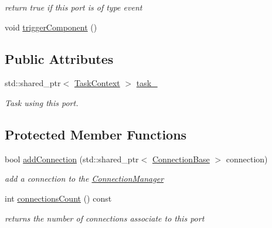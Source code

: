 \begin{DoxyCompactItemize}
\begin{DoxyCompactList}\small\item\em return true if this port is of type event \end{DoxyCompactList}\item 
void \hyperlink{classcoco_1_1_port_base_a8de69f58ac8d4110b51cba2616dc0ebc}{trigger\-Component} ()
\end{DoxyCompactItemize}
\subsection*{Public Attributes}
\begin{DoxyCompactItemize}
\item 
\hypertarget{classcoco_1_1_port_base_af6fede884062c2b3a774ed69da5c0291}{std\-::shared\-\_\-ptr$<$ \hyperlink{classcoco_1_1_task_context}{Task\-Context} $>$ \hyperlink{classcoco_1_1_port_base_af6fede884062c2b3a774ed69da5c0291}{task\-\_\-}}\label{classcoco_1_1_port_base_af6fede884062c2b3a774ed69da5c0291}

\begin{DoxyCompactList}\small\item\em Task using this port. \end{DoxyCompactList}\end{DoxyCompactItemize}
\subsection*{Protected Member Functions}
\begin{DoxyCompactItemize}
\item 
\hypertarget{classcoco_1_1_port_base_afa50a47a0608471a7e182c5f848193ca}{bool \hyperlink{classcoco_1_1_port_base_afa50a47a0608471a7e182c5f848193ca}{add\-Connection} (std\-::shared\-\_\-ptr$<$ \hyperlink{classcoco_1_1_connection_base}{Connection\-Base} $>$ connection)}\label{classcoco_1_1_port_base_afa50a47a0608471a7e182c5f848193ca}

\begin{DoxyCompactList}\small\item\em add a connection to the \hyperlink{classcoco_1_1_connection_manager}{Connection\-Manager} \end{DoxyCompactList}\item 
\hypertarget{classcoco_1_1_port_base_ab2ec3f4ef49a5afec734149b75644709}{int \hyperlink{classcoco_1_1_port_base_ab2ec3f4ef49a5afec734149b75644709}{connections\-Count} () const }\label{classcoco_1_1_port_base_ab2ec3f4ef49a5afec734149b75644709}

\begin{DoxyCompactList}\small\item\em returns the number of connections associate to this port \end{DoxyCompactList}\end{DoxyCompactItemize}
